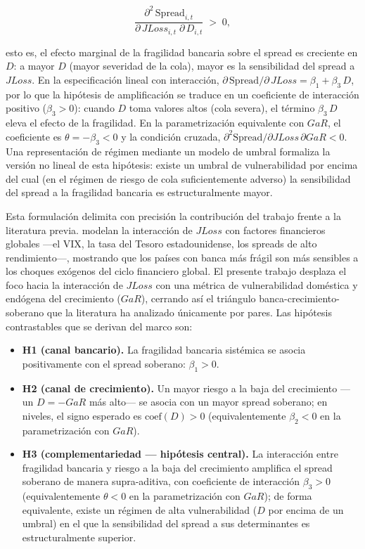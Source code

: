 \[ \frac{\partial^{2}\, \mathrm{Spread}_{i,t}}{\partial\, JLoss_{i,t}\;\partial\, D_{i,t}} \;>\; 0, \]

esto es, el efecto marginal de la fragilidad bancaria sobre el spread es creciente en $D$: a mayor $D$ (mayor severidad de la cola), mayor es la sensibilidad del spread a $JLoss$. En la especificación lineal con interacción, $\partial\, \mathrm{Spread}/\partial\, JLoss = \beta_{1} + \beta_{3}\,D$, por lo que la hipótesis de amplificación se traduce en un coeficiente de interacción positivo ($\beta_{3} > 0$): cuando $D$ toma valores altos (cola severa), el término $\beta_{3}\,D$ eleva el efecto de la fragilidad. En la parametrización equivalente con $GaR$, el coeficiente es $\theta=-\beta_3<0$ y la condición cruzada, $\partial^2\mathrm{Spread}/\partial JLoss\,\partial GaR<0$. Una representación de régimen mediante un modelo de umbral \citep{Hansen2000} formaliza la versión no lineal de esta hipótesis: existe un umbral de vulnerabilidad por encima del cual (en el régimen de riesgo de cola suficientemente adverso) la sensibilidad del spread a la fragilidad bancaria es estructuralmente mayor.

Esta formulación delimita con precisión la contribución del trabajo frente a la literatura previa. \citet{Chari2024b} modelan la interacción de $JLoss$ con factores financieros globales —el VIX, la tasa del Tesoro estadounidense, los spreads de alto rendimiento—, mostrando que los países con banca más frágil son más sensibles a los choques exógenos del ciclo financiero global. El presente trabajo desplaza el foco hacia la interacción de $JLoss$ con una métrica de vulnerabilidad doméstica y endógena del crecimiento ($GaR$), cerrando así el triángulo banca-crecimiento-soberano que la literatura ha analizado únicamente por pares. Las hipótesis contrastables que se derivan del marco son:

\begin{itemize}
    \item \textbf{H1 (canal bancario).} La fragilidad bancaria sistémica se asocia positivamente con el spread soberano: $\beta_{1} > 0$.
    \item \textbf{H2 (canal de crecimiento).} Un mayor riesgo a la baja del crecimiento —un $D=-GaR$ más alto— se asocia con un mayor spread soberano; en niveles, el signo esperado es $\text{coef}(D) > 0$ (equivalentemente $\beta_{2} < 0$ en la parametrización con $GaR$).
    \item \textbf{H3 (complementariedad — hipótesis central).} La interacción entre fragilidad bancaria y riesgo a la baja del crecimiento amplifica el spread soberano de manera supra-aditiva, con coeficiente de interacción $\beta_{3} > 0$ (equivalentemente $\theta < 0$ en la parametrización con $GaR$); de forma equivalente, existe un régimen de alta vulnerabilidad ($D$ por encima de un umbral) en el que la sensibilidad del spread a sus determinantes es estructuralmente superior.
\end{itemize}

